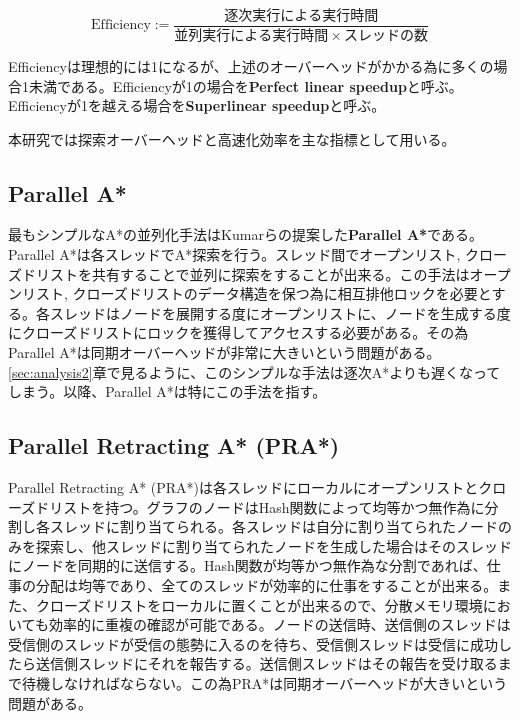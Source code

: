 \documentclass[uplatex]{jsarticle}
\begin{document}
\begin{equation}
	\mbox{Efficiency} := \frac{逐次実行による実行時間}{並列実行による実行時間 \times スレッドの数} %
\end{equation}

Efficiencyは理想的には1になるが、上述のオーバーヘッドがかかる為に多くの場合1未満である。Efficiencyが1の場合を\textbf{Perfect linear speedup}と呼ぶ。Efficiencyが1を越える場合を\textbf{Superlinear speedup}と呼ぶ。

本研究では探索オーバーヘッドと高速化効率を主な指標として用いる。

\subsection{Parallel A*}
最もシンプルなA*の並列化手法はKumarらの提案した\textbf{Parallel A*}である\cite{Kumar1988parallel}。Parallel A*は各スレッドでA*探索を行う。スレッド間でオープンリスト, クローズドリストを共有することで並列に探索をすることが出来る。この手法はオープンリスト, クローズドリストのデータ構造を保つ為に相互排他ロックを必要とする。各スレッドはノードを展開する度にオープンリストに、ノードを生成する度にクローズドリストにロックを獲得してアクセスする必要がある。その為Parallel A*は同期オーバーヘッドが非常に大きいという問題がある。\ref{sec:analysis2}章で見るように、このシンプルな手法は逐次A*よりも遅くなってしまう。以降、Parallel A*は特にこの手法を指す。


\subsection{Parallel Retracting A* (PRA*)}
Parallel Retracting A* (PRA*)は各スレッドにローカルにオープンリストとクローズドリストを持つ\cite{evett1995massively}。グラフのノードはHash関数によって均等かつ無作為に分割し各スレッドに割り当てられる。各スレッドは自分に割り当てられたノードのみを探索し、他スレッドに割り当てられたノードを生成した場合はそのスレッドにノードを同期的に送信する。Hash関数が均等かつ無作為な分割であれば、仕事の分配は均等であり、全てのスレッドが効率的に仕事をすることが出来る。また、クローズドリストをローカルに置くことが出来るので、分散メモリ環境においても効率的に重複の確認が可能である。ノードの送信時、送信側のスレッドは受信側のスレッドが受信の態勢に入るのを待ち、受信側スレッドは受信に成功したら送信側スレッドにそれを報告する。送信側スレッドはその報告を受け取るまで待機しなければならない。この為PRA*は同期オーバーヘッドが大きいという問題がある。
\newline
\end{document}
